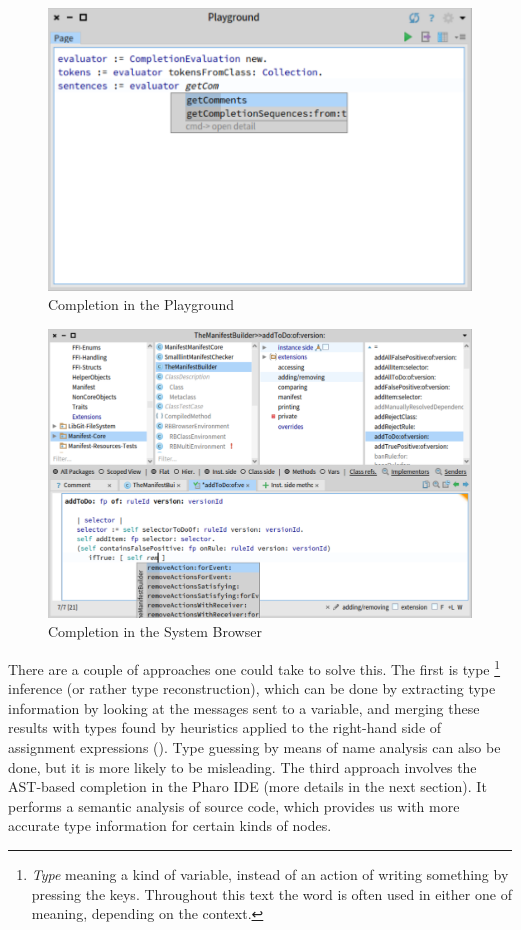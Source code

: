 \begin{figure}[H]
    \centering
    \includegraphics[width=0.9\linewidth]{images/completion1.png}
    \caption{Completion in the Playground}
    \label{fig:playground}
\end{figure}

\begin{figure}[H]
    \centering
    \includegraphics[width=0.9\linewidth]{images/completion2.png}
    \caption{Completion in the System Browser}
    \label{fig:editor}
\end{figure}

There are a couple of approaches one could take to solve this. The first is type \footnote{\textit{Type} meaning a kind of variable, instead of an action of writing something by pressing the keys. Throughout this text the word is often used in either one of meaning, depending on the context.} inference (or rather type reconstruction), which can be done by extracting type information by looking at the messages sent to a variable, and merging these results with types found by heuristics applied to the right-hand side of assignment expressions (\cite{Pluq09a}). Type guessing by means of name analysis can also be done, but it is more likely to be misleading. The third approach involves the AST-based completion in the Pharo IDE (more details in the next section). It performs a semantic analysis of source code, which provides us with more accurate type information for certain kinds of nodes.

